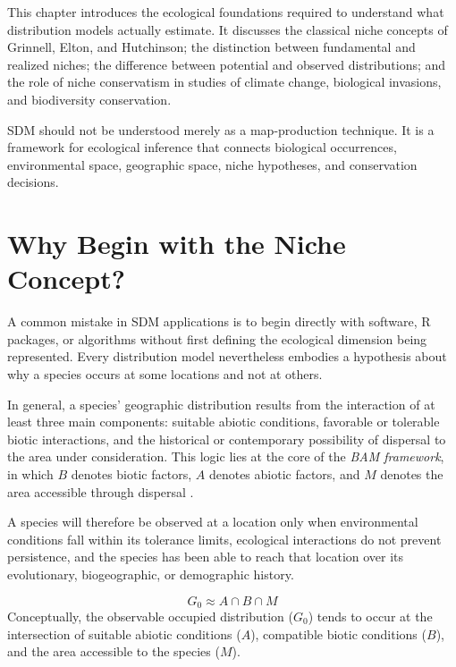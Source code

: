 This chapter introduces the ecological foundations required to understand what
distribution models actually estimate. It discusses the classical niche
concepts of Grinnell, Elton, and Hutchinson; the distinction between fundamental
and realized niches; the difference between potential and observed
distributions; and the role of niche conservatism in studies of climate change,
biological invasions, and biodiversity conservation.

\begin{conceito}
SDM should not be understood merely as a map-production technique. It is a
framework for ecological inference that connects biological occurrences,
environmental space, geographic space, niche hypotheses, and conservation
decisions.
\end{conceito}

\section{Why Begin with the Niche Concept?}

A common mistake in SDM applications is to begin directly with software, R
packages, or algorithms without first defining the ecological dimension being
represented. Every distribution model nevertheless embodies a hypothesis about
why a species occurs at some locations and not at others.

In general, a species' geographic distribution results from the interaction of
at least three main components: suitable abiotic conditions, favorable or
tolerable biotic interactions, and the historical or contemporary possibility
of dispersal to the area under consideration. This logic lies at the core of the
\textit{BAM framework}, in which $B$ denotes biotic factors, $A$ denotes abiotic
factors, and $M$ denotes the area accessible through dispersal
\parencite{soberon2005,soberon2009,barve2011crucial}.

A species will therefore be observed at a location only when environmental
conditions fall within its tolerance limits, ecological interactions do not
prevent persistence, and the species has been able to reach that location over
its evolutionary, biogeographic, or demographic history.

\begin{equationbox}
\[
G_0 \approx A \cap B \cap M
\]
Conceptually, the observable occupied distribution ($G_0$) tends to occur at the
intersection of suitable abiotic conditions ($A$), compatible biotic conditions
($B$), and the area accessible to the species ($M$).
\end{equationbox}

